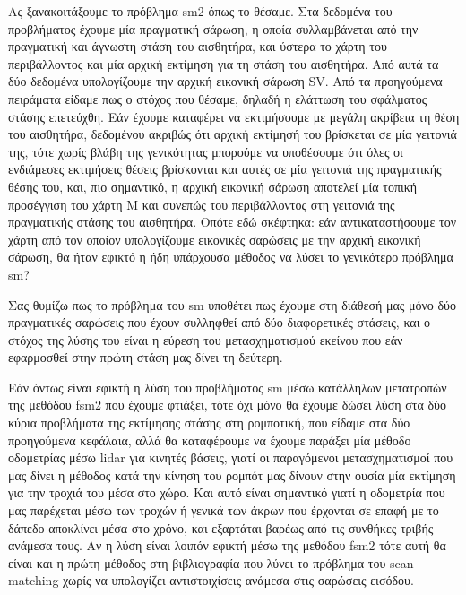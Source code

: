 \documentclass[a4paper,10pt]{article}
\begin{document}

Ας ξανακοιτάξουμε το πρόβλημα sm2 όπως το θέσαμε. Στα δεδομένα του προβλήματος
έχουμε μία πραγματική σάρωση, η οποία συλλαμβάνεται από την πραγματική και
άγνωστη στάση του αισθητήρα, και ύστερα το χάρτη του περιβάλλοντος και μία
αρχική εκτίμηση για τη στάση του αισθητήρα. Από αυτά τα δύο δεδομένα υπολογίζουμε
την αρχική εικονική σάρωση SV. Από τα προηγούμενα πειράματα είδαμε πως ο
στόχος που θέσαμε, δηλαδή η ελάττωση του σφάλματος στάσης επετεύχθη. Εάν έχουμε
καταφέρει να εκτιμήσουμε με μεγάλη ακρίβεια τη θέση του αισθητήρα, δεδομένου
ακριβώς ότι αρχική εκτίμησή του βρίσκεται σε μία γειτονιά της, τότε χωρίς
βλάβη της γενικότητας μπορούμε να υποθέσουμε ότι όλες οι ενδιάμεσες εκτιμήσεις
θέσεις βρίσκονται και αυτές σε μία γειτονιά της πραγματικής θέσης του, και,
πιο σημαντικό, η αρχική εικονική σάρωση αποτελεί μία τοπική προσέγγιση του
χάρτη M και συνεπώς του περιβάλλοντος στη γειτονιά της πραγματικής στάσης του
αισθητήρα. Οπότε εδώ σκέφτηκα: εάν αντικαταστήσουμε τον χάρτη από τον οποίον
υπολογίζουμε εικονικές σαρώσεις με την αρχική εικονική σάρωση, θα ήταν εφικτό
η ήδη υπάρχουσα μέθοδος να λύσει το γενικότερο πρόβλημα sm?

Σας θυμίζω πως το πρόβλημα του sm υποθέτει πως έχουμε στη διάθεσή μας μόνο
δύο πραγματικές σαρώσεις που έχουν συλληφθεί από δύο διαφορετικές στάσεις, και
ο στόχος της λύσης του είναι η εύρεση του μετασχηματισμού εκείνου που εάν
εφαρμοσθεί στην πρώτη στάση μας δίνει τη δεύτερη.

Εάν όντως είναι εφικτή η λύση του προβλήματος sm μέσω κατάλληλων μετατροπών της
μεθόδου fsm2 που έχουμε φτιάξει, τότε όχι μόνο θα έχουμε δώσει λύση στα δύο
κύρια προβλήματα της εκτίμησης στάσης στη ρομποτική, που είδαμε στα δύο
προηγούμενα κεφάλαια, αλλά θα καταφέρουμε να έχουμε παράξει μία μέθοδο
οδομετρίας μέσω lidar για κινητές βάσεις, γιατί οι παραγόμενοι μετασχηματισμοί
που μας δίνει η μέθοδος κατά την κίνηση του ρομπότ μας δίνουν στην ουσία μία
εκτίμηση για την τροχιά του μέσα στο χώρο. Και αυτό είναι σημαντικό γιατί
η οδομετρία που μας παρέχεται μέσω των τροχών ή γενικά των άκρων που έρχονται
σε επαφή με το δάπεδο αποκλίνει μέσα στο χρόνο, και εξαρτάται βαρέως από τις
συνθήκες τριβής ανάμεσα τους. Αν η λύση είναι λοιπόν εφικτή μέσω της μεθόδου
fsm2 τότε αυτή θα είναι και η πρώτη μέθοδος στη βιβλιογραφία που λύνει το
πρόβλημα του scan matching χωρίς να υπολογίζει αντιστοιχίσεις ανάμεσα στις
σαρώσεις εισόδου.
\end{document}
